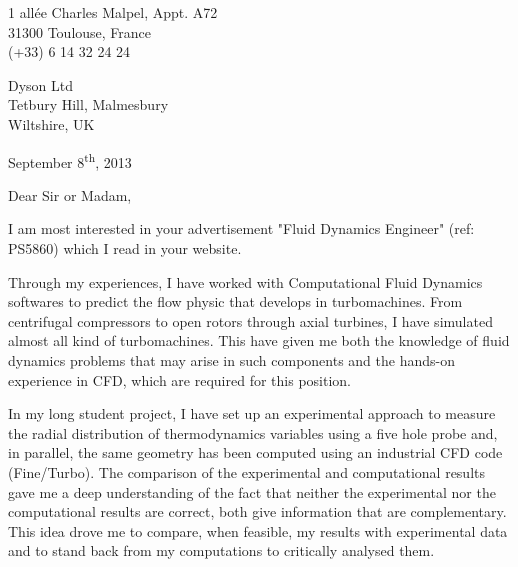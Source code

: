 \documentclass[10pt]{article}
\begin{document}
\begin{flushright}
	1 allée Charles Malpel, Appt. A72 \\
	31300 Toulouse, France \\
	(+33) 6 14 32 24 24 \\
\end{flushright}

\begin{flushleft}
Dyson Ltd \\
Tetbury Hill, Malmesbury \\
Wiltshire, UK
\end{flushleft}

\begin{flushright}
September 8\textsuperscript{th}, 2013
\end{flushright}

\noindent
Dear Sir or Madam,
\newline

\noindent
I am most interested in your advertisement "Fluid
Dynamics Engineer" (ref: PS5860) which I read in your website.
\newline

\noindent
Through my experiences, I have worked with Computational Fluid Dynamics
softwares to predict the flow physic that develops in turbomachines. From centrifugal 
compressors to open rotors through axial turbines, I have simulated 
almost all kind of turbomachines.
This have given me both the knowledge of 
fluid dynamics problems that may arise in such components and 
the hands-on experience in CFD, which are required for this position.
\newline

\noindent
In my long student project,
I have set up an experimental approach to measure the radial distribution
of thermodynamics variables using a five hole probe and, in parallel, the same
geometry has been computed using an industrial CFD code (Fine/Turbo). The comparison
of the experimental and computational results gave me a deep 
understanding of the fact that neither the experimental nor the computational
results are correct, both give information that are complementary.
This idea drove me to compare, when feasible, my results with
experimental data and to stand back from my computations to critically
analysed them.
\newline
\end{document}
